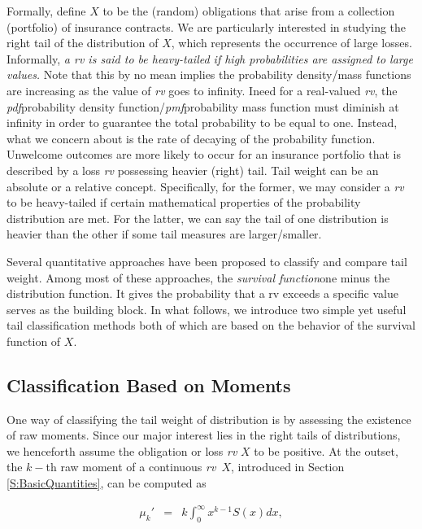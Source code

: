 \documentclass[]{book}
\theoremstyle{definition}
\theoremstyle{definition}
\theoremstyle{definition}
\theoremstyle{remark}
\begin{document}
Formally, define \(X\) to be the (random) obligations that arise from a
collection (portfolio) of insurance contracts. We are particularly
interested in studying the right tail of the distribution of \(X\),
which represents the occurrence of large losses. Informally, \emph{a rv
is said to be heavy-tailed if high probabilities are assigned to large
values.} Note that this by no mean implies the probability density/mass
functions are increasing as the value of \emph{rv} goes to infinity.
Ineed for a real-valued \emph{rv}, the \emph{pdf}{probability density
function}/\emph{pmf}{probability mass function} must diminish at
infinity in order to guarantee the total probability to be equal to one.
Instead, what we concern about is the rate of decaying of the
probability function. Unwelcome outcomes are more likely to occur for an
insurance portfolio that is described by a loss \emph{rv} possessing
heavier (right) tail. Tail weight can be an absolute or a relative
concept. Specifically, for the former, we may consider a \emph{rv} to be
heavy-tailed if certain mathematical properties of the probability
distribution are met. For the latter, we can say the tail of one
distribution is heavier than the other if some tail measures are
larger/smaller.

Several quantitative approaches have been proposed to classify and
compare tail weight. Among most of these approaches, the \emph{survival
function}{one minus the distribution function. It gives the probability
that a rv exceeds a specific value} serves as the building block. In
what follows, we introduce two simple yet useful tail classification
methods both of which are based on the behavior of the survival function
of \(X\).

\subsection{Classification Based on
Moments}\label{classification-based-on-moments}

One way of classifying the tail weight of distribution is by assessing
the existence of raw moments. Since our major interest lies in the right
tails of distributions, we henceforth assume the obligation or loss
\emph{rv} \(X\) to be positive. At the outset, the \(k-\)th raw moment
of a continuous \emph{rv}~\(X\), introduced in Section
\ref{S:BasicQuantities}, can be computed as

\begin{eqnarray*}
    \mu_k' &=& k \int_0^{\infty} x^{k-1} S(x) dx, \\
\end{eqnarray*}
\end{document}

